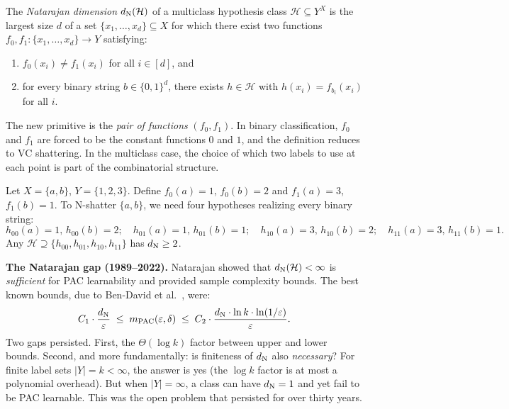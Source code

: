 \begin{defn}
\label{def:natarajan-dim}
The \emph{Natarajan dimension} $d_{\mathrm{N}}(\mathcal{H})$ of a multiclass hypothesis
class $\mathcal{H} \subseteq Y^X$ is the largest size $d$ of a set
$\{x_1, \ldots, x_d\} \subseteq X$ for which there exist two functions
$f_0, f_1 \colon \{x_1, \ldots, x_d\} \to Y$ satisfying:
\begin{enumerate}[leftmargin=*,nosep]
\item $f_0(x_i) \neq f_1(x_i)$ for all $i \in [d]$, and
\item for every binary string $b \in \{0,1\}^d$, there exists $h \in
  \mathcal{H}$ with $h(x_i) = f_{b_i}(x_i)$ for all $i$.
\end{enumerate}
\end{defn}

The new primitive is the \emph{pair of functions} $(f_0, f_1)$.  In binary
classification, $f_0$ and $f_1$ are forced to be the constant functions $0$
and $1$, and the definition reduces to VC shattering.  In the multiclass case,
the choice of which two labels to use at each point is part of the
combinatorial structure.

\begin{example}[Natarajan shattering with $k=3$]
\label{ex:natarajan-k3}
Let $X = \{a, b\}$, $Y = \{1,2,3\}$.  Define $f_0(a)=1$, $f_0(b)=2$
and $f_1(a)=3$, $f_1(b)=1$.  To N-shatter $\{a,b\}$, we need four
hypotheses realizing every binary string:
\[
  h_{00}(a)=1,\, h_{00}(b)=2;\quad
  h_{01}(a)=1,\, h_{01}(b)=1;\quad
  h_{10}(a)=3,\, h_{10}(b)=2;\quad
  h_{11}(a)=3,\, h_{11}(b)=1.
\]
Any $\mathcal{H} \supseteq \{h_{00}, h_{01}, h_{10}, h_{11}\}$ has $d_{\mathrm{N}} \geq 2$.
\end{example}

\begin{historical}
\textbf{The Natarajan gap (1989--2022).}
Natarajan showed that $d_{\mathrm{N}}(\mathcal{H}) < \infty$ is \emph{sufficient}
for PAC learnability and provided sample complexity bounds.  The best
known bounds, due to Ben-David et al.~\cite{BenDavidCesaBianchiHausslerLong1995},
were:
\[
  C_1 \cdot \frac{d_{\mathrm{N}}}{\varepsilon}
  \;\leq\; m_{\mathrm{PAC}}(\varepsilon,\delta)
  \;\leq\; C_2 \cdot \frac{d_{\mathrm{N}} \cdot \ln k \cdot \ln(1/\varepsilon)}{\varepsilon}.
\]
Two gaps persisted.  First, the $\Theta(\log k)$ factor between upper
and lower bounds.  Second, and more fundamentally: is finiteness of $d_{\mathrm{N}}$
also \emph{necessary}?  For finite label sets $|Y| = k < \infty$, the answer
is yes (the $\log k$ factor is at most a polynomial overhead).  But when
$|Y| = \infty$, a class can have $d_{\mathrm{N}} = 1$ and yet fail to be PAC learnable.
This was the open problem that persisted for over thirty years.
\end{historical}


